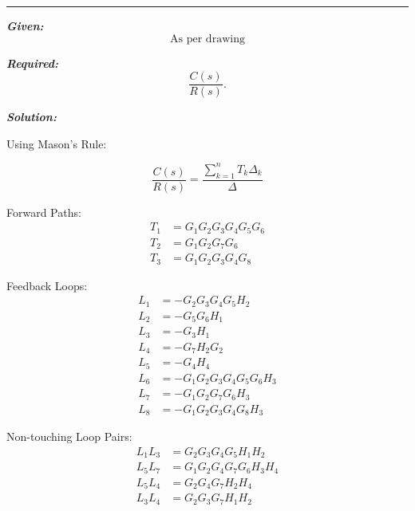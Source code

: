 \documentclass[11pt]{article}
\begin{document}
\noindent\rule{\textwidth}{1pt}




\vspace{5pt}

\noindent\textbf{\textit{Given:}}  
\[
\text{As per drawing}
\]



\vspace{1em}
\noindent

\noindent\textbf{\textit{Required:}}  
\[
\frac{C(s)}{R(s)}.
\]

\vspace{1.5em}
\noindent\textbf{\textit{Solution:}}  

\vspace{2pt}
{Using Mason’s Rule:}

\[
\frac{C(s)}{R(s)} = \frac{\sum_{k=1}^{n} T_k \Delta_k}{\Delta}
\]

Forward Paths:
\begin{align*}
T_1 &= G_1 G_2 G_3 G_4 G_5 G_6 \\
T_2 &= G_1 G_2 G_7 G_6 \\
T_3 &= G_1 G_2 G_3 G_4 G_8
\end{align*}

\vspace{0.5em}

Feedback Loops:
\begin{align*}
L_1 &= -G_2 G_3 G_4 G_5 H_2 \\
L_2 &= -G_5 G_6 H_1 \\
L_3 &= -G_3 H_1 \\
L_4 &= -G_7 H_2 G_2 \\
L_5 &= -G_4 H_4 \\
L_6 &= -G_1 G_2 G_3 G_4 G_5 G_6 H_3 \\
L_7 &= -G_1 G_2 G_7 G_6 H_3 \\
L_8 &= -G_1 G_2 G_3 G_4 G_8 H_3
\end{align*}

\vspace{0.5em}

Non-touching Loop Pairs:
\begin{align*}
L_1L_3 &= G_2 G_3 G_4 G_5 H_1 H_2 \\
L_5L_7 &= G_1 G_2 G_4 G_7 G_6 H_3 H_4 \\
L_5L_4 &= G_2 G_4 G_7 H_2 H_4 \\
L_3L_4 &= G_2 G_3 G_7 H_1 H_2
\end{align*}

\vspace{0.5em}
\end{document}

